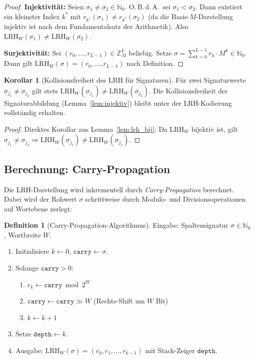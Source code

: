 ﻿\documentclass[a4paper,12pt]{article}
\theoremstyle{definition}
\newtheorem{definition}{Definition}
\newtheorem{korollar}{Korollar}
\begin{document}
\begin{proof}
\textbf{Injektivität:} Seien $\sigma_1 \neq \sigma_2 \in \mathbb{N}_0$.
O.\,B.\,d.\,A.\ sei $\sigma_1 < \sigma_2$. Dann existiert ein kleinster Index $k^*$ mit
$r_{k^*}(\sigma_1) \neq r_{k^*}(\sigma_2)$ (da die Basis-$M$-Darstellung injektiv ist
nach dem Fundamentalsatz der Arithmetik). Also
$\mathrm{LRH}_W(\sigma_1) \neq \mathrm{LRH}_W(\sigma_2)$.

\textbf{Surjektivität:} Sei $(r_0, \ldots, r_{L-1}) \in \mathbb{Z}_M^L$ beliebig.
Setze $\sigma = \sum_{k=0}^{L-1} r_k \cdot M^k \in \mathbb{N}_0$.
Dann gilt $\mathrm{LRH}_W(\sigma) = (r_0, \ldots, r_{L-1})$ nach Definition.
\end{proof}

\begin{korollar}[Kollisionsfreiheit des LRH für Signaturen]
\label{kor:lrh_kollfrei}
Für zwei Signaturwerte $\sigma_{j_1} \neq \sigma_{j_2}$ gilt stets
$\mathrm{LRH}_W(\sigma_{j_1}) \neq \mathrm{LRH}_W(\sigma_{j_2})$.
Die Kollisionsfreiheit der Signaturabbildung (Lemma~\ref{lem:injektiv}) bleibt
unter der LRH-Kodierung vollständig erhalten.
\end{korollar}

\begin{proof}
Direktes Korollar aus Lemma~\ref{lem:lrh_bij}: Da $\mathrm{LRH}_W$ bijektiv ist,
gilt $\sigma_{j_1} \neq \sigma_{j_2} \Rightarrow \mathrm{LRH}_W(\sigma_{j_1}) \neq
\mathrm{LRH}_W(\sigma_{j_2})$.
\end{proof}

\subsection{Berechnung: Carry-Propagation}

Die LRH-Darstellung wird inkrementell durch \emph{Carry-Propagation} berechnet.
Dabei wird der Rohwert $\sigma$ schrittweise durch Modulo- und Divisionsoperationen
auf Wortebene zerlegt:

\begin{definition}[Carry-Propagation-Algorithmus]
\label{def:carry}
Eingabe: Spaltensignatur $\sigma \in \mathbb{N}_0$, Wortbreite $W$.
\begin{enumerate}
  \item Initialisiere $k \leftarrow 0$, $\mathtt{carry} \leftarrow \sigma$.
  \item Solange $\mathtt{carry} > 0$:
    \begin{enumerate}
      \item $r_k \leftarrow \mathtt{carry} \bmod 2^W$
      \item $\mathtt{carry} \leftarrow \mathtt{carry} \gg W$ \quad (Rechts-Shift um $W$ Bit)
      \item $k \leftarrow k + 1$
    \end{enumerate}
  \item Setze $\mathtt{depth} \leftarrow k$.
  \item Ausgabe: $\mathrm{LRH}_W(\sigma) = (r_0, r_1, \ldots, r_{k-1})$ mit Stack-Zeiger
        $\mathtt{depth}$.
\end{enumerate}
\end{definition}
\end{document}
